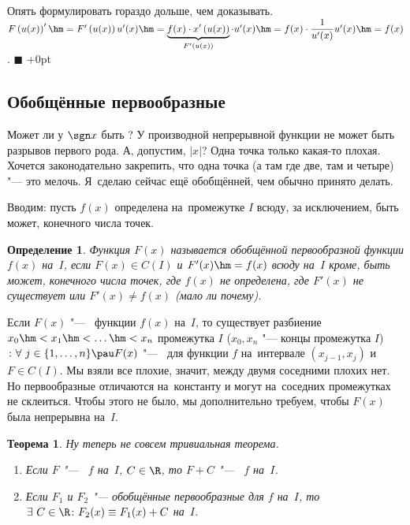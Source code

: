 \documentclass[a4paper,10pt,twoside]{article}
\newtheorem{Def}{Определение}[section]
\newtheorem{The}{Теорема}[section]
\newenvironment{Proof}
       {\par\noindent{\textbf{Доказательство.}}}
       {\hfill$\scriptstyle\blacksquare$}
\begin{document}
\delimitershortfall-1pt
\begin{Proof}
  Опять формулировать гораздо дольше, чем доказывать. $F\left(u(x)\right)' \hm= F'\left(u(x)\right)u'(x)\hm=
  \underbrace{f(x)\cdot x'\left(u(x)\right)}_{F'\left(u(x)\right)}
  \cdot u'(x)\hm=f(x)\cdot \dfrac{1}{u'(x)}u'(x) \hm= f(x)$.
\end{Proof}
\delimitershortfall+0pt

\subsection{Обобщённые первообразные}
Может ли у $\sgn x $ быть \tp? У производной непрерывной функции не может быть разрывов первого рода. А, допустим, $|x|$? Одна точка только какая-то плохая. Хочется законодательно закрепить, что одна точка (а там где две, там и четыре) "--- это мелочь. Я~сделаю сейчас ещё обобщённей, чем обычно принято делать.

Вводим: пусть $f(x)$ определена на~промежутке $I$ всюду, за исключением, быть может, конечного числа точек.

\begin{Def}
  Функция $F(x)$ называется обобщённой первообразной функции $f(x)$ на~$I$, если $F(x)\in C(I)$ и $F'(x)\hm=f(x)$ всюду на~$I$ кроме, быть может, конечного числа точек,
  где $f(x)$ не определена, где $F'(x)$ не существует или $F'(x)\neq f(x)$ (мало ли почему).
\end{Def}

Если $F(x)$ "--- \op\ функции $f(x)$ на~$I$, то существует разбиение $x_0\hm<x_1\hm<\ldots\hm<x_n$ промежутка $I$ ($x_0,x_n$ "--- концы промежутка $I$)$\colon
\forall\  j\in\{1,\ldots,n\}\pau F(x)$ "--- \tp\ для функции $f$ на~интервале $(x_{j-1},x_j)$ и $F\in C(I)$. Мы взяли все плохие, значит, между двумя соседними плохих нет. Но первообразные отличаются на~константу и могут на~соседних промежутках не склеиться. Чтобы этого не было, мы дополнительно
требуем, чтобы $F(x)$ была непрерывна на~$I$.

\begin{The} Ну теперь не совсем тривиальная теорема.
    \begin{enumerate}
      \item Если $F$ "--- \op\ $f$ на~$I$, $C\in\R$, то $F+C$ "--- \op\ $f$ на~$I$.

      \item Если $F_1$ и $F_2$ "--- обобщённые первообразные для $f$ на~$I$, то
      $\exists\  C\in\R\colon F_2(x)\equiv F_1(x)+C$ на~$I$.
    \end{enumerate}


\end{The}
\end{document}
